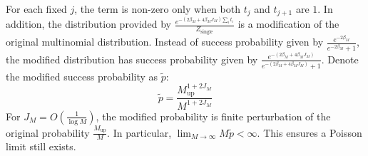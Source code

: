 \documentclass[a4paper,11pt]{article}
\theoremstyle{definition}
\numberwithin{equation}{section}
\begin{document}
For each fixed $j$, the term is non-zero only when both $t_j$ and $t_{j + 1}$ are $1$. In addition, the distribution provided by $\frac{e^{-(2\beta_M + 4\beta_M J_M)\sum_it_i}}{Z_\text{single}}$ is a modification of the original multinomial distribution. Instead of success probability given by $\frac{e^{-2\beta_M}}{e^{-2\beta_M} + 1}$, the modified distribution has success probability given by $\frac{e^{-(2\beta_M + 4\beta_M J_M)}}{e^{-(2\beta_M + 4\beta_M J_M)} + 1}$. Denote the modified success probability as $\widetilde{p}$:
\begin{equation}
    \widetilde{p} = \frac{M^{1 + 2J_M}_\text{up}}{M^{1+ 2J_M}}
\end{equation}
For $J_M = O(\frac{1}{\log M})$, the modified probability is finite perturbation of the original probability $\frac{M_\text{up}}{M}$. In particular, $\lim_{M\rightarrow \infty}M\widetilde{p} < \infty$. This ensures a Poisson limit still exists.
\end{document}

